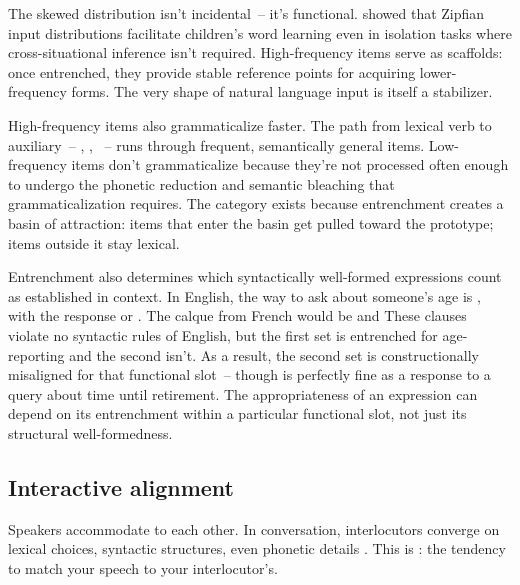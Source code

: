 The skewed distribution isn't incidental~-- it's functional. \textcite{wolters2024zipfian} showed that Zipfian input distributions facilitate children's word learning even in isolation tasks where cross-situational inference isn't required. High-frequency items serve as scaffolds: once entrenched, they provide stable reference points for acquiring lower-frequency forms. The very shape of natural language input is itself a stabilizer.

High-frequency items also grammaticalize faster. The path from lexical verb to auxiliary~-- , , ~-- runs through frequent, semantically general items. Low-frequency items don't grammaticalize because they're not processed often enough to undergo the phonetic reduction and semantic bleaching that grammaticalization requires. The category  exists because entrenchment creates a basin of attraction: items that enter the basin get pulled toward the prototype; items outside it stay lexical.

Entrenchment also determines which syntactically well-formed expressions count as established in context. In English, the way to ask about someone's age is , with the response  or . The calque from French would be  and  These clauses violate no syntactic rules of English, but the first set is entrenched for age-reporting and the second isn't. As a result, the second set is constructionally misaligned for that functional slot~-- though  is perfectly fine as a response to a query about time until retirement. The appropriateness of an expression can depend on its entrenchment within a particular functional slot, not just its structural well-formedness.

\subsection{Interactive alignment}
\label{subsec:4:alignment}

Speakers accommodate to each other. In conversation, interlocutors converge on lexical choices, syntactic structures, even phonetic details \citep{pickering2004,garrod2009}. This is : the tendency to match your speech to your interlocutor's.

